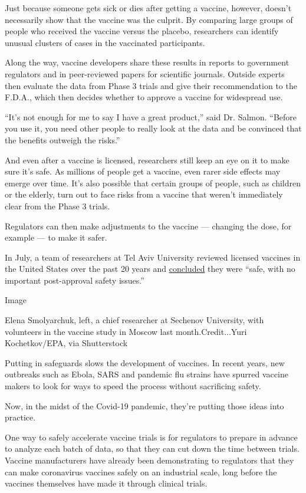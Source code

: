 Just because someone gets sick or dies after getting a vaccine, however,
doesn't necessarily show that the vaccine was the culprit. By comparing
large groups of people who received the vaccine versus the placebo,
researchers can identify unusual clusters of cases in the vaccinated
participants.

Along the way, vaccine developers share these results in reports to
government regulators and in peer-reviewed papers for scientific
journals. Outside experts then evaluate the data from Phase 3 trials and
give their recommendation to the F.D.A., which then decides whether to
approve a vaccine for widespread use.

``It's not enough for me to say I have a great product,'' said Dr.
Salmon. ``Before you use it, you need other people to really look at the
data and be convinced that the benefits outweigh the risks.''

And even after a vaccine is licensed, researchers still keep an eye on
it to make sure it's safe. As millions of people get a vaccine, even
rarer side effects may emerge over time. It's also possible that certain
groups of people, such as children or the elderly, turn out to face
risks from a vaccine that weren't immediately clear from the Phase 3
trials.

Regulators can then make adjustments to the vaccine --- changing the
dose, for example --- to make it safer.

In July, a team of researchers at Tel Aviv University reviewed licensed
vaccines in the United States over the past 20 years and
\href{https://doi.org/10.7326/M20-2726}{concluded} they were ``safe,
with no important post-approval safety issues.''

Image

Elena Smolyarchuk, left, a chief researcher at Sechenov University, with
volunteers in the vaccine study in Moscow last month.Credit...Yuri
Kochetkov/EPA, via Shutterstock

Putting in safeguards slows the development of vaccines. In recent
years, new outbreaks such as Ebola, SARS and pandemic flu strains have
spurred vaccine makers to look for ways to speed the process without
sacrificing safety.

Now, in the midst of the Covid-19 pandemic, they're putting those ideas
into practice.

One way to safely accelerate vaccine trials is for regulators to prepare
in advance to analyze each batch of data, so that they can cut down the
time between trials. Vaccine manufacturers have already been
demonstrating to regulators that they can make coronavirus vaccines
safely on an industrial scale, long before the vaccines themselves have
made it through clinical trials.

